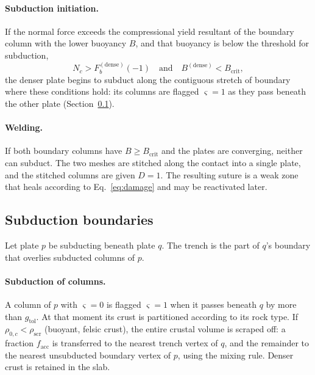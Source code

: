 \documentclass[11pt]{article}
\begin{document}
\paragraph{Subduction initiation.}
If the normal force exceeds the compressional yield resultant of the boundary
column with the lower buoyancy $B$, and that buoyancy is below the threshold for
subduction,
\begin{equation}
  N_c > F_b^{(\mathrm{dense})}(-1)
  \quad\text{and}\quad
  B^{(\mathrm{dense})} < B_{\mathrm{crit}},
\end{equation}
the denser plate begins to subduct along the contiguous stretch of boundary
where these conditions hold: its columns are flagged $\varsigma=1$ as they pass
beneath the other plate (Section~\ref{sec:convergent}).

\paragraph{Welding.}
If both boundary columns have $B \ge B_{\mathrm{crit}}$ and the plates are
converging, neither can subduct. The two meshes are stitched along the contact
into a single plate, and the stitched columns are given $D = 1$. The resulting
suture is a weak zone that heals according to Eq.~\eqref{eq:damage} and may be
reactivated later.

\subsection{Subduction boundaries}
\label{sec:convergent}

Let plate $p$ be subducting beneath plate $q$. The trench is the part of
$q$'s boundary that overlies subducted columns of $p$.

\paragraph{Subduction of columns.}
A column of $p$ with $\varsigma = 0$ is flagged $\varsigma = 1$ when it passes
beneath $q$ by more than $g_{\mathrm{tol}}$. At that moment its crust is
partitioned according to its rock type. If $\rho_{0,c} < \rho_{\mathrm{scr}}$
(buoyant, felsic crust), the entire crustal volume is scraped off: a fraction
$f_{\mathrm{acc}}$ is transferred to the nearest trench vertex of $q$, and the
remainder to the nearest unsubducted boundary vertex of $p$, using the mixing
rule. Denser crust is retained in the slab.
\end{document}
